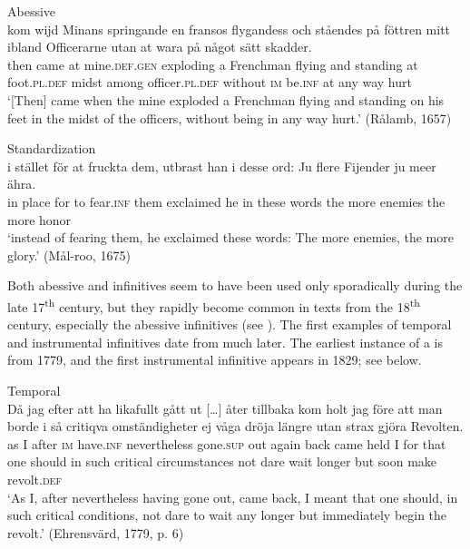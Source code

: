 \documentclass[output=paper]{langscibook}
\begin{document}
\ea
\label{ex:kalm:12}
\ea {}Abessive\\\label{ex:kalm:12a}
\gll[Då] kom wijd Minans springande en fransos flygandess och ståendes på föttren       mitt ibland Officerarne utan at wara på något sätt skadder.\\
then came at mine.\textsc{def.gen} exploding a Frenchman flying and standing at foot.\textsc{pl.def} midst among officer.\textsc{pl.def} without \textsc{im} be.\textsc{inf} at any way hurt \\ 
\glt ‘[Then] came when the mine exploded a Frenchman flying and standing on his feet in the midst of the officers, without being in any way hurt.’ (Rålamb, 1657)

\ex {}Standardization\\\label{ex:kalm:12b}
\gll i stället för at fruckta dem, utbrast han i desse ord: Ju flere Fijender ju meer ähra.\\
 in place for to fear.\textsc{inf} them exclaimed he in these words the more enemies the more honor\\
\glt ‘instead of fearing them, he exclaimed these words: The more enemies, the more glory.’ (Mål-roo, 1675)
\z 
\z 


Both abessive and  infinitives seem to have been used only sporadically during the late 17\textsuperscript{th} century, but they rapidly become common in texts from the 18\textsuperscript{th} century, especially the abessive infinitives (see \citealt[129–130]{Kalm2016Satsekvivalenta}). The first examples of temporal and instrumental infinitives date from much later. The earliest instance of a  is from 1779, and the first instrumental infinitive appears in 1829; see  below.  

\ea
\label{ex:kalm:13}
\ea Temporal\label{ex:kalm:13a}\\
\gll Då jag efter att ha likafullt gått {ut […]} åter tillbaka kom holt jag före att man borde i så critiqva omständigheter ej våga dröja längre utan strax gjöra Revolten.\\
as I after \textsc{im} have.\textsc{inf} nevertheless gone.\textsc{sup} out again back came held I for that one should in such critical circumstances not dare wait longer but soon make revolt.\textsc{def}\\
\glt ‘As I, after nevertheless having gone out, came back, I meant that one should, in such critical conditions, not dare to wait any longer but immediately begin the revolt.’ (Ehrensvärd, 1779, p. 6)
\end{document}
